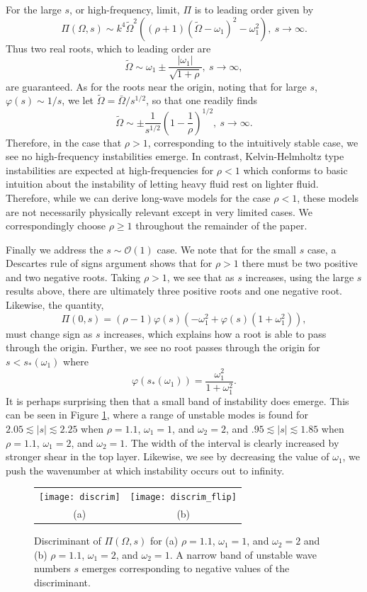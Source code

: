 \documentclass[a4paper,11pt]{article}
\begin{document}
For the large $s$, or high-frequency, limit, $\Pi$ is to leading order given by 
\[
\Pi(\Omega,s) \sim k^{4}\tilde{\Omega}^{2}\left( (\rho+1)\left(\tilde{\Omega}-\omega_{1} \right)^{2} - \omega_{1}^{2} \right), ~ s\rightarrow \infty.
\]
Thus two real roots, which to leading order are 
\[
\tilde{\Omega} \sim \omega_{1} \pm \frac{|\omega_{1}|}{\sqrt{1+\rho}}, ~s\rightarrow \infty, 
\]
 are guaranteed.  As for the roots near the origin, noting that for large $s$, $\varphi(s) \sim 1/s$, we let $\tilde{\Omega} = \bar{\Omega}/s^{1/2}$, so that one readily finds 
\[
\tilde{\Omega} \sim \pm\frac{1}{s^{1/2}}\left(1 - \frac{1}{\rho} \right)^{1/2}, ~ s\rightarrow \infty.
\]
Therefore, in the case that $\rho>1$, corresponding to the intuitively stable case, we see no high-frequency instabilities emerge.  In contrast, Kelvin-Helmholtz \cite{lamb} type instabilities are expected at high-frequencies for $\rho < 1$ which conforms to basic intuition about the instability of letting heavy fluid rest on lighter fluid.  Therefore, while we can derive long-wave models for the case $\rho<1$, these models are not necessarily physically relevant except in very limited cases.  We correspondingly choose $\rho \geq 1$ throughout the remainder of the paper.    

Finally we address the $s\sim \mathcal{O}(1)$ case.  We note that for the small $s$ case, a Descartes rule of signs argument shows that for $\rho>1$ there must be two positive and two negative roots.  Taking $\rho>1$, we see that as $s$ increases, using the large $s$ results above, there are ultimately three positive roots and one negative root.  Likewise, the quantity, 
\[
\Pi(0,s) = (\rho-1)\varphi(s)(-\omega_{1}^{2}+\varphi(s)(1+\omega_{1}^{2})),
\]
must change sign as $s$ increases, which explains how a root is able to pass through the origin.  Further, we see no root passes through the origin for $s<s_{\ast}(\omega_{1})$ where
\[
\varphi(s_{\ast}(\omega_{1})) = \frac{\omega_{1}^{2}}{1+\omega_{1}^{2}}.  
\]
It is perhaps surprising then that a small band of instability does emerge.  This can be seen in Figure \ref{fig:discrim}, where a range of unstable modes is found for $2.05\lesssim |s| \lesssim 2.25$ when $\rho=1.1$, $\omega_{1}=1$, and $\omega_{2}=2$, and $.95\lesssim |s| \lesssim 1.85$ when $\rho=1.1$, $\omega_{1}=2$, and $\omega_{2}=1$.  The width of the interval is clearly increased by stronger shear in the top layer.  Likewise, we see by decreasing the value of $\omega_{1}$, we push the wavenumber at which instability occurs out to infinity.  
\begin{figure}[t]
\centering
\begin{tabular}{cc}
\texttt{[image: discrim]} & \texttt{[image: discrim\_flip]}\\
(a) & (b)
\end{tabular}
\caption{Discriminant of $\Pi(\Omega,s)$ for (a) $\rho=1.1$, $\omega_{1}=1$, and $\omega_{2}=2$ and (b) $\rho=1.1$, $\omega_{1}=2$, and $\omega_{2}=1$.  A narrow band of unstable wave numbers $s$ emerges corresponding to negative values of the discriminant. }
\label{fig:discrim}
\end{figure}
\end{document}
